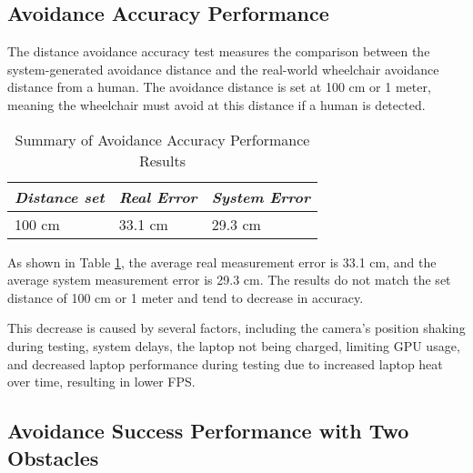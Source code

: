 \subsection{Avoidance Accuracy Performance}
The distance avoidance accuracy test measures the comparison between the system-generated avoidance distance and the real-world wheelchair avoidance distance from a human. The avoidance distance is set at 100 cm or 1 meter, meaning the wheelchair must avoid at this distance if a human is detected.

\begin{table}[H]
    \centering
    \caption{Summary of Avoidance Accuracy Performance Results}
    \label{tb:agungkeren}
    \begin{tabular}{|l|l|l|}
    \hline
    \textit{Distance set} & \textit{Real Error} & \textit{System Error} \\ \hline
    100 cm & 33.1 cm & 29.3 cm\\ \hline
    \end{tabular}
\end{table}

As shown in Table \ref{tb:agungkeren}, the average real measurement error is 33.1 cm, and the average system measurement error is 29.3 cm. The results do not match the set distance of 100 cm or 1 meter and tend to decrease in accuracy.

This decrease is caused by several factors, including the camera's position shaking during testing, system delays, the laptop not being charged, limiting GPU usage, and decreased laptop performance during testing due to increased laptop heat over time, resulting in lower FPS.

\subsection{Avoidance Success Performance with Two Obstacles}

